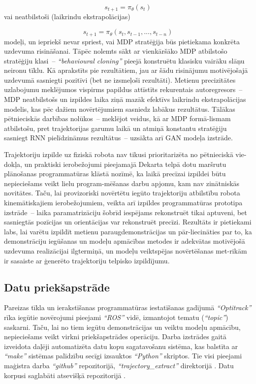 \documentclass[12pt, a4paper]{article}
\numberwithin{equation}{section} %
\begin{document}
\begin{equation}
    s_{t+1} = \pi_{\theta}(s_t)
\end{equation}
vai neatbilstoši (laikrindu ekstrapolācijas)

\begin{equation}
    s_{t+1} = \pi_{\theta}(s_t, s_{t-1}, ..., s_{t-n})
\end{equation}
modeļi, un iepriekš nevar spriest, vai MDP stratēģija būs pietiekama konkrēta uzdevuma risināšanai. Tāpēc nolemts sākt ar vienkāršāko MDP atbilstošo stratēģiju klasi~-- \textit{``behavioural cloning''} pieejā konstruētu klasisku vairāku slāņu neironu tīklu. Kā aprakstīts pie rezultātiem, jau ar šādu risinājumu motivējošajā uzdevumā sasniegti pozitīvi (bet ne izsmeļoši rezultāti). Metienu precizitātes uzlabojumu meklējumos vispirms papildus attīstīts rekurentais autoregresors~-- MDP neatbilstošs un izpildes laika ziņā mazāk efektīvs laikrindu ekstrapolācijas modelis, kas pēc dažiem novērtējumiem sasniedz labākus rezultātus. Tālākas pētnieciskās darbības nolūkos~-- meklējot veidus, kā ar MDP formā-lismam atbilstošu, pret trajektorijas garumu laikā un atmiņā konstantu stratēģiju sasniegt RNN pielīdzināmus rezultātus~-- uzsākta arī GAN modeļa izstrāde.


Trajektoriju izpilde uz fiziskā robota nav tikusi prioritarizēta no pētnieciskā vie-dokļa, un praktiski ierobežojumi pieejamajā Dekarta telpā dotu maršrutu plānošanas programmatūras klāstā nozīmē, ka laikā precīzai izpildei būtu nepieciešams veikt lielu program-mēšanas darbu apjomu, kam nav zinātniskās novitātes. Taču, lai provizoriski novērtētu iegūto trajektoriju atbilstību robota kinemātiskajiem ierobežojumiem, veikta arī izpildes programmatūras prototipa izstrāde~-- laika paramatrizāciju šobrīd iespējams rekonstruēt tikai aptuveni, bet sasniegtās pozīcijas un orientācijas var rekonstruēt precīzi. Rezultāts ir pietiekami labs, lai varētu izpildīt metienu paraugdemonstrācijas un pār-liecināties par to, ka demonstrāciju iegūšanas un modeļu apmācības metodes ir adekvātas motivējošā uzdevuma realizācijai ilgtermiņā, un modeļu veiktspējas novērtēšanas met-rikām ir sasaiste ar ģenerēto trajektoriju telpisko izpildījumu.

\subsection{Datu priekšapstrāde}

Pareizas tīkla un ierakstīšanas programmatūras iestatīšanas gadījumā \textit{``Optitrack''} rīka iegūtie novērojumi pieejami \textit{``ROS''} vidē, izmantojot tematu (\textit{``topic''}) saskarni. Taču, lai no tiem iegūtu demonstrācijas un veiktu modeļu apmācību, nepieciešams veikt virkni priekšapstrādes operāciju. Darba izstrādes gaitā izveidota daļēji automatizēta datu kopu sagatavošanu sistēma, kas balstīta ar \textit{``make''} sistēmas palīdzību secīgi izsauktos \textit{``Python''} skriptos. Tie visi pieejami maģistra darba \textit{``github''} repozitorijā, \textit{``trajectory\_extract''} direktorijā \cite{md_repo}. Datu korpusi saglabāti atsevišķā repozitorijā \cite{md_data_repo}.
\end{document}
